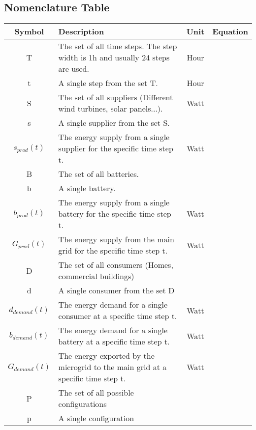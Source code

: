 \subsection{Nomenclature Table}
	\begin{longtable}{|c|p{}|c|c|}
		\toprule
		\textbf{Symbol} & \textbf{Description} & \textbf{Unit} & \textbf{Equation} \\ \midrule
		T & The set of all time steps. The step width is 1h and usually 24 steps are used. & Hour & \Cref{eq1:balance,eq:opt} \\ \midrule
		t & A single step from the set T. & Hour & \Cref{eq1:balance,eq:opt} \\ \midrule
		S & The set of all suppliers (Different wind turbines, solar panels...). & Watt & \Cref{eq1:balance} \\ \midrule
		s & A single supplier from the set S. & & \Cref{eq1:balance} \\ \midrule
		$s_{prod}(t)$ & The energy supply from a single supplier for the specific time step t. & Watt & \Cref{eq1:balance} \\ \midrule
		B & The set of all batteries. & & \Cref{eq1:balance} \\ \midrule
		b & A single battery. & & \Cref{eq1:balance} \\ \midrule
		$b_{prod}(t)$ & The energy supply from a single battery for the specific time step t. & Watt & \Cref{eq1:balance} \\ \midrule
		$G_{prod}(t)$ & The energy supply from the main grid for the specific time step t. & Watt & \Cref{eq1:balance} \\ \midrule
		D & The set of all consumers (Homes, commercial buildings) & & \Cref{eq1:balance} \\ \midrule
		d & A single consumer from the set D & & \Cref{eq1:balance} \\ \midrule
		$d_{demand}(t)$ & The energy demand for a single consumer at a specific time step t. & Watt & \Cref{eq1:balance} \\ \midrule
		$b_{demand}(t)$ & The energy demand for a single battery at a specific time step t. & Watt & \Cref{eq1:balance} \\ \midrule
		$G_{demand}(t)$ & The energy exported by the microgrid to the main grid at a specific time step t. & Watt & \Cref{eq1:balance} \\
		P & The set of all possible configurations &  & \Cref{eq:opt} \\ \midrule
		p & A single configuration &  & \Cref{eq:opt} \\ \midrule

\end{longtable}
